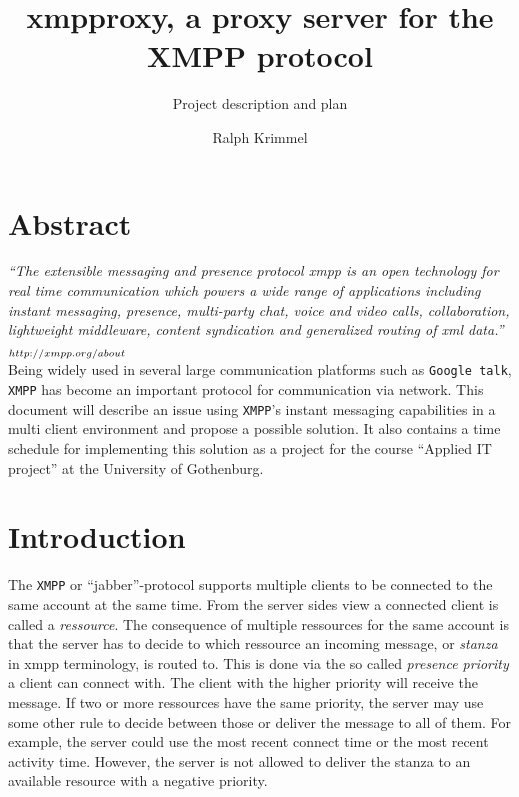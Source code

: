 \documentclass[a4paper,10pt,numbers=noendperiod]{scrartcl}
\author{Ralph Krimmel}
\title{xmpproxy, a proxy server for the XMPP protocol}
\subtitle{ Project description and plan }
\begin{document}
\maketitle{}
\thispagestyle{empty}
\newpage
\tableofcontents{}
\newpage

\section{Abstract}
\textit{``The extensible messaging and presence protocol xmpp is an open technology 
for real time communication which powers a wide range of applications including instant messaging, 
presence, multi-party chat, voice and video calls, collaboration, lightweight middleware, 
content syndication and generalized routing of xml data.''}   $_{\tiny http://xmpp.org/about}$ \\

Being widely used in several large communication platforms such as \texttt{Google talk},  %
\texttt{XMPP} has become an important protocol for communication via network. This document will describe an 
issue using \texttt{XMPP}'s instant messaging capabilities in a multi client environment and propose a possible solution.
It also contains a time schedule for implementing this solution as a project for the course ``Applied IT project'' at the University 
of Gothenburg.

\section{Introduction}
The \texttt{XMPP} or ``jabber''-protocol supports multiple clients to be connected to the same account at the same time. From the server sides view a connected client is called a \textit{ressource}. The consequence of multiple ressources for the same account is that the server has to decide to which ressource an incoming message, or \textit{stanza} in xmpp terminology, is routed to. This is done via the so called \textit{presence priority} a client can connect with.  The client with the higher priority will receive the message. 
If two or more ressources have the same priority, the server may use some other rule to decide between those or deliver the message to all of them. For example, the server could use the most recent connect time or the most recent activity time. However, the server is not allowed to deliver the stanza to an available resource with a negative priority. %
\end{document}
